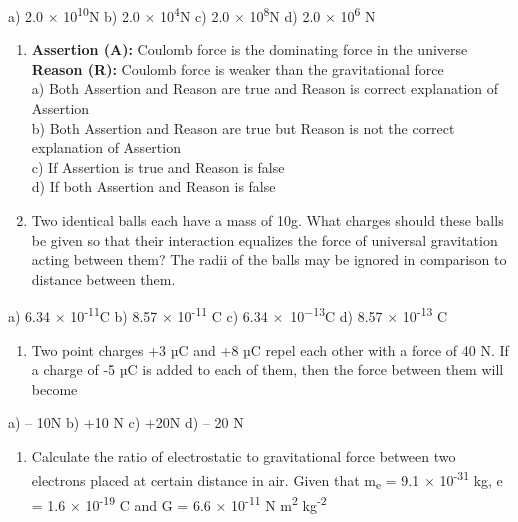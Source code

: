 a) 2.0 × 10\textsuperscript{10}N b) 2.0 × 10\textsuperscript{4}N c) 2.0
× 10\textsuperscript{8}N d) 2.0 × 10\textsuperscript{6} N

\begin{enumerate}
\def\labelenumi{\arabic{enumi}.}
\setcounter{enumi}{9}
\item
  \textbf{Assertion (A):} Coulomb force is the dominating force in the
  universe\\
  \textbf{Reason (R):} Coulomb force is weaker than the gravitational
  force\\
  a) Both Assertion and Reason are true and Reason is correct
  explanation of Assertion\\
  b) Both Assertion and Reason are true but Reason is not the correct
  explanation of Assertion\\
  c) If Assertion is true and Reason is false\\
  d) If both Assertion and Reason is false
\item
  Two identical balls each have a mass of 10g. What charges should these
  balls be given so that their interaction equalizes the force of
  universal gravitation acting between them? The radii of the balls may
  be ignored in comparison to distance between them.
\end{enumerate}

a) 6.34 × 10\textsuperscript{-11}C b) 8.57 × 10\textsuperscript{-11} C
c) 6.34 ×~10\textsuperscript{−13}C d) 8.57 × 10\textsuperscript{-13} C

\begin{enumerate}
\def\labelenumi{\arabic{enumi}.}
\setcounter{enumi}{11}
\item
  Two point charges +3 µC and +8 µC repel each other with a force of 40
  N. If a charge of -5 µC is added to each of them, then the force
  between them will become
\end{enumerate}

a) -- 10N b) +10 N c) +20N d) -- 20 N

\begin{enumerate}
\def\labelenumi{\arabic{enumi}.}
\setcounter{enumi}{12}
\item
  Calculate the ratio of electrostatic to gravitational force between
  two electrons placed at certain distance in air. Given that
  m\textsubscript{e} = 9.1 × 10\textsuperscript{-31} kg, e = 1.6 ×
  10\textsuperscript{-19} C and G = 6.6 × 10\textsuperscript{-11} N
  m\textsuperscript{2} kg\textsuperscript{-2}
\end{enumerate}

